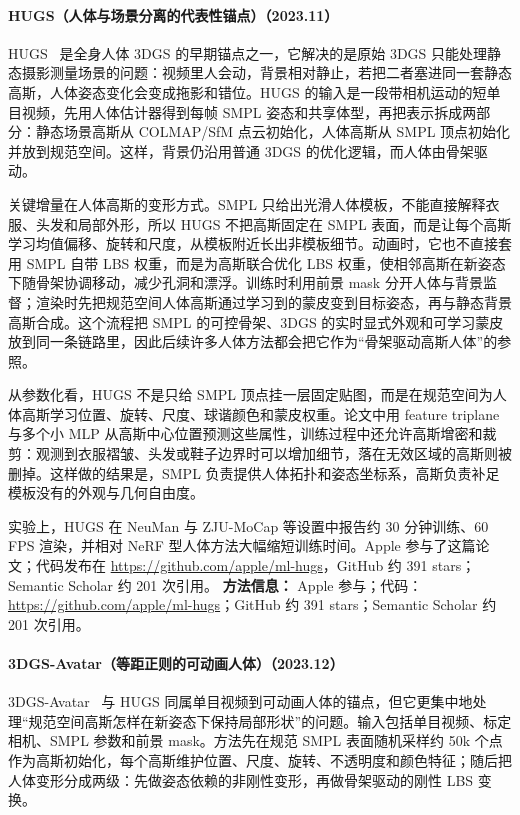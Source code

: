 \paragraph{HUGS（人体与场景分离的代表性锚点）（2023.11）}
HUGS~\cite{2311_17910} 是全身人体 3DGS 的早期锚点之一，它解决的是原始 3DGS 只能处理静态摄影测量场景的问题：视频里人会动，背景相对静止，若把二者塞进同一套静态高斯，人体姿态变化会变成拖影和错位。HUGS 的输入是一段带相机运动的短单目视频，先用人体估计器得到每帧 SMPL 姿态和共享体型，再把表示拆成两部分：静态场景高斯从 COLMAP/SfM 点云初始化，人体高斯从 SMPL 顶点初始化并放到规范空间。这样，背景仍沿用普通 3DGS 的优化逻辑，而人体由骨架驱动。

关键增量在人体高斯的变形方式。SMPL 只给出光滑人体模板，不能直接解释衣服、头发和局部外形，所以 HUGS 不把高斯固定在 SMPL 表面，而是让每个高斯学习均值偏移、旋转和尺度，从模板附近长出非模板细节。动画时，它也不直接套用 SMPL 自带 LBS 权重，而是为高斯联合优化 LBS 权重，使相邻高斯在新姿态下随骨架协调移动，减少孔洞和漂浮。训练时利用前景 mask 分开人体与背景监督；渲染时先把规范空间人体高斯通过学习到的蒙皮变到目标姿态，再与静态背景高斯合成。这个流程把 SMPL 的可控骨架、3DGS 的实时显式外观和可学习蒙皮放到同一条链路里，因此后续许多人体方法都会把它作为“骨架驱动高斯人体”的参照。

从参数化看，HUGS 不是只给 SMPL 顶点挂一层固定贴图，而是在规范空间为人体高斯学习位置、旋转、尺度、球谐颜色和蒙皮权重。论文中用 feature triplane 与多个小 MLP 从高斯中心位置预测这些属性，训练过程中还允许高斯增密和裁剪：观测到衣服褶皱、头发或鞋子边界时可以增加细节，落在无效区域的高斯则被删掉。这样做的结果是，SMPL 负责提供人体拓扑和姿态坐标系，高斯负责补足模板没有的外观与几何自由度。

实验上，HUGS 在 NeuMan 与 ZJU-MoCap 等设置中报告约 30 分钟训练、60 FPS 渲染，并相对 NeRF 型人体方法大幅缩短训练时间。Apple 参与了这篇论文；代码发布在 \url{https://github.com/apple/ml-hugs}，GitHub 约 391 stars；Semantic Scholar 约 201 次引用。
\textbf{方法信息：} Apple 参与；代码：\url{https://github.com/apple/ml-hugs}；GitHub 约 391 stars；Semantic Scholar 约 201 次引用。



\paragraph{3DGS-Avatar（等距正则的可动画人体）（2023.12）}
3DGS-Avatar~\cite{2312_09228} 与 HUGS 同属单目视频到可动画人体的锚点，但它更集中地处理“规范空间高斯怎样在新姿态下保持局部形状”的问题。输入包括单目视频、标定相机、SMPL 参数和前景 mask。方法先在规范 SMPL 表面随机采样约 50k 个点作为高斯初始化，每个高斯维护位置、尺度、旋转、不透明度和颜色特征；随后把人体变形分成两级：先做姿态依赖的非刚性变形，再做骨架驱动的刚性 LBS 变换。

